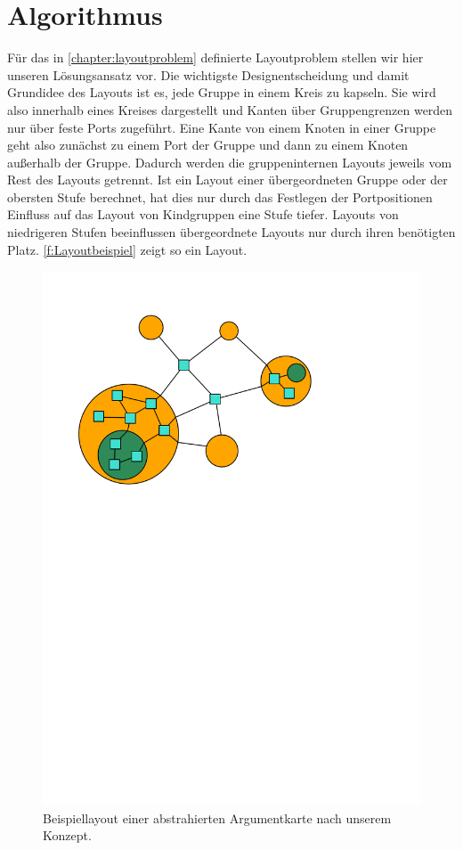 \chapter{Algorithmus} %
\label{chapter:algo}

Für das in \autoref{chapter:layoutproblem} definierte Layoutproblem stellen wir hier unseren Lösungsansatz vor.
Die wichtigste Designentscheidung und damit Grundidee des Layouts ist es, jede Gruppe in einem Kreis zu kapseln. 
Sie wird also innerhalb eines Kreises dargestellt und Kanten über Gruppengrenzen werden nur über feste Ports zugeführt.
Eine Kante von einem Knoten in einer Gruppe geht also zunächst zu einem Port der Gruppe und dann zu einem Knoten außerhalb der Gruppe.
Dadurch werden die gruppeninternen Layouts jeweils vom Rest des Layouts getrennt. Ist ein Layout einer übergeordneten Gruppe oder der obersten Stufe berechnet, 
hat dies nur durch das Festlegen der Portpositionen Einfluss auf das Layout von Kindgruppen eine Stufe tiefer. 
Layouts von niedrigeren Stufen beeinflussen übergeordnete Layouts nur durch ihren benötigten Platz.
\autoref{f:Layoutbeispiel} zeigt so ein Layout.

\begin{figure}[h!]
\begin{center} 
  \includegraphics[width=0.7\linewidth]{Pics/Layoutbeispiel.pdf}
  \caption{Beispiellayout einer abstrahierten Argumentkarte nach unserem Konzept.}
  \label{f:Layoutbeispiel}
\end{center}
\end{figure}

